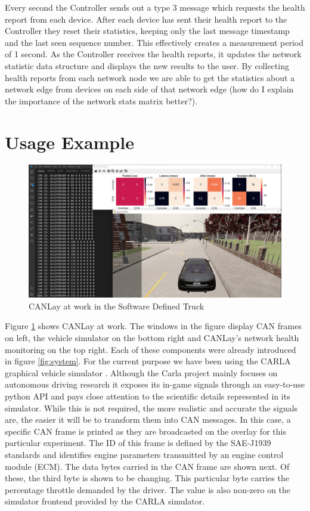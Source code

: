 \documentclass[letterpaper,twocolumn,12pt]{article}
\begin{document}
Every second the Controller sends out a type 3 message which requests the health report from each device. After each device has sent their health report to the Controller they reset their statistics, keeping only the last message timestamp and the last seen sequence number. This effectively creates a measurement period of 1 second. As the Controller receives the health reports, it updates the network statistic data structure and displays the new results to the user. By collecting health reports from each network node we are able to get the statistics about a network edge from devices on each side of that network edge (how do I explain the importance of the network stats matrix better?).


\section{Usage Example}\label{sec:usage}
\begin{figure}[t!]
    \centering
    \includegraphics[width=\linewidth]{images/usability.png}
    \caption{CANLay at work in the Software Defined Truck}
    \label{fig:usabiity}
\end{figure}
Figure \ref{fig:usabiity} shows CANLay at work. The windows in the figure display CAN frames on left, the vehicle simulator on the bottom right and CANLay's network health monitoring on the top right. Each of these components were already introduced in figure \ref{fig:system}. For the current purpose we have been using the CARLA graphical vehicle simulator \cite{Dosovitskiy17}. 
Although the Carla project mainly focuses on autonomous driving research it exposes its in-game signals through an easy-to-use python API and pays close attention to the scientific details represented in its simulator. While this is not required, the more realistic and accurate the signals are, the easier it will be to transform them into CAN messages. In this case, a specific CAN frame is printed as they are broadcasted on the overlay for this particular experiment. The ID of this frame is defined by the SAE-J1939 standards \cite{society_of_automotive_engineers_sae_nodate} and identifies engine parameters transmitted by an engine control module (ECM). The data bytes carried in the CAN frame are shown next. Of these, the third byte is shown to be changing. This particular byte carries the percentage throttle demanded by the driver. The value is also non-zero on the simulator frontend provided by the CARLA simulator.
\end{document}

